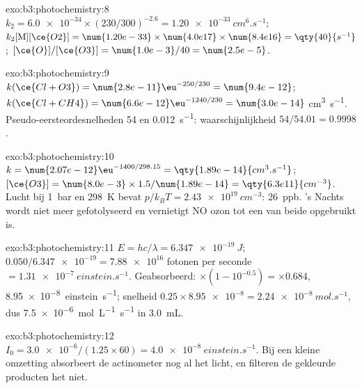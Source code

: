 \begin{solution}{exo:b3:photochemistry:8}
$k_2 = \num{6.0e-34} \times (230/300)^{-2.6} = \qty{1.20e-33}{cm^6.s^{-1}}$; $k_2[\mathrm M][\ce{O2}] = \num{1.20e-33} \times
\num{4.0e17} \times \num{8.4e16} = \qty{40}{s^{-1}}$; $[\ce{O}]/[\ce{O3}] = \num{1.0e-3}/40 = \num{2.5e-5}$.
\end{solution}

\begin{solution}{exo:b3:photochemistry:9}
$k(\ce{Cl + O3}) = \num{2.8e-11}\eu^{-250/230} = \num{9.4e-12}$; $k(\ce{Cl + CH4}) = \num{6.6e-12}\eu^{-1240/230} = \num{3.0e-14}$
\unit{cm^3.s^{-1}}. Pseudo-eersteordesnelheden 54 en \qty{0.012}{s^{-1}}:
waarschijnlijkheid $54/54.01 = 0.9998$.
\end{solution}

\begin{solution}{exo:b3:photochemistry:10}
$k = \num{2.07e-12}\eu^{-1400/298.15} = \qty{1.89e-14}{cm^3.s^{-1}}$; $[\ce{O3}] = \num{8.0e-3} \times 1.5/\num{1.89e-14} =
\qty{6.3e11}{cm^{-3}}$. Lucht bij \qty{1}{bar} en \qty{298}{K} bevat $p/k_BT = \qty{2.43e19}{cm^{-3}}$: \qty{26}{ppb}.
's Nachts wordt  niet meer gefotolyseerd en vernietigt NO ozon tot
een van beide opgebruikt is.
\end{solution}

\begin{solution}{exo:b3:photochemistry:11}
$E = hc/\lambda = \qty{6.347e-19}{J}$; $0.050/\num{6.347e-19} = \num{7.88e16}$ fotonen per seconde $= \qty{1.31e-7}{einstein.s^{-1}}$.
Geabsorbeerd: $\times(1 - 10^{-0.5}) = \times0.684$, \qty{8.95e-8}{einstein.s^{-1}}; snelheid $0.25 \times \num{8.95e-8} =
\qty{2.24e-8}{mol.s^{-1}}$, dus \qty{7.5e-6}{mol.L^{-1}.s^{-1}} in \qty{3.0}{mL}.
\end{solution}

\begin{solution}{exo:b3:photochemistry:12}
$I_0 = \num{3.0e-6}/(1.25 \times 60) = \qty{4.0e-8}{einstein.s^{-1}}$. Bij een
kleine omzetting absorbeert de actinometer nog al het licht, en filteren
de gekleurde producten het niet.
\end{solution}


